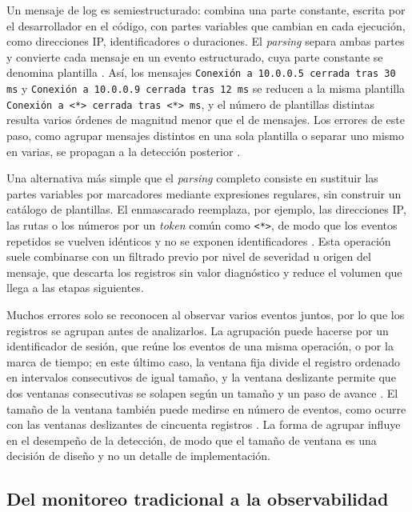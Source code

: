 Un mensaje de log es semiestructurado: combina una parte constante, escrita por el desarrollador en el código, con partes variables que cambian en cada ejecución, como direcciones IP, identificadores o duraciones. El \textit{parsing} separa ambas partes y convierte cada mensaje en un evento estructurado, cuya parte constante se denomina plantilla \cite{he2021_survey}. Así, los mensajes \texttt{Conexión a 10.0.0.5 cerrada tras 30 ms} y \texttt{Conexión a 10.0.0.9 cerrada tras 12 ms} se reducen a la misma plantilla \texttt{Conexión a <*> cerrada tras <*> ms}, y el número de plantillas distintas resulta varios órdenes de magnitud menor que el de mensajes. Los errores de este paso, como agrupar mensajes distintos en una sola plantilla o separar uno mismo en varias, se propagan a la detección posterior \cite{sun2026_parsing}.

Una alternativa más simple que el \textit{parsing} completo consiste en sustituir las partes variables por marcadores mediante expresiones regulares, sin construir un catálogo de plantillas. El enmascarado reemplaza, por ejemplo, las direcciones IP, las rutas o los números por un \textit{token} común como \texttt{<*>}, de modo que los eventos repetidos se vuelven idénticos y no se exponen identificadores \cite{guan2024_logllm}. Esta operación suele combinarse con un filtrado previo por nivel de severidad u origen del mensaje, que descarta los registros sin valor diagnóstico y reduce el volumen que llega a las etapas siguientes.

Muchos errores solo se reconocen al observar varios eventos juntos, por lo que los registros se agrupan antes de analizarlos. La agrupación puede hacerse por un identificador de sesión, que reúne los eventos de una misma operación, o por la marca de tiempo; en este último caso, la ventana fija divide el registro ordenado en intervalos consecutivos de igual tamaño, y la ventana deslizante permite que dos ventanas consecutivas se solapen según un tamaño y un paso de avance \cite{he2021_survey}. El tamaño de la ventana también puede medirse en número de eventos, como ocurre con las ventanas deslizantes de cincuenta registros \cite{lim2025_logadreft}. La forma de agrupar influye en el desempeño de la detección, de modo que el tamaño de ventana es una decisión de diseño y no un detalle de implementación.

\subsection{Del monitoreo tradicional a la observabilidad}\label{sec:ant_observabilidad}

